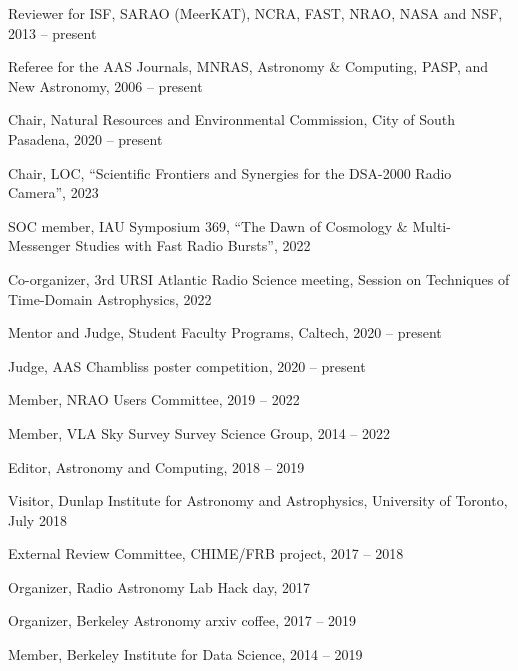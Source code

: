 \documentclass[11pt]{article}
\begin{document}
\begin{bibsection}

    \item Reviewer for ISF, SARAO (MeerKAT), NCRA, FAST, NRAO, NASA and NSF, 2013 -- present

    \item Referee for the AAS Journals, MNRAS, Astronomy \& Computing, PASP, and New Astronomy, 2006 -- present

    \item Chair, Natural Resources and Environmental Commission, City of South Pasadena, 2020 -- present

    \item Chair, LOC, ``Scientific Frontiers and Synergies for the DSA-2000 Radio Camera'', 2023

    \item SOC member, IAU Symposium 369, ``The Dawn of Cosmology \& Multi-Messenger Studies with Fast Radio Bursts'', 2022

    \item Co-organizer, 3rd URSI Atlantic Radio Science meeting, Session on Techniques of Time-Domain Astrophysics, 2022

    \item Mentor and Judge, Student Faculty Programs, Caltech, 2020 -- present

    \item Judge, AAS Chambliss poster competition, 2020 -- present

    \item Member, NRAO Users Committee, 2019 -- 2022  

    \item Member, VLA Sky Survey Survey Science Group, 2014 -- 2022

    \item Editor, Astronomy and Computing, 2018 -- 2019

    \item Visitor, Dunlap Institute for Astronomy and Astrophysics, University of Toronto, July 2018

    \item External Review Committee, CHIME/FRB project, 2017 -- 2018

    \item Organizer, Radio Astronomy Lab Hack day, 2017
    
    \item Organizer, Berkeley Astronomy arxiv coffee, 2017 -- 2019
    
    \item Member, Berkeley Institute for Data Science, 2014 -- 2019


\end{bibsection}
\end{document}
